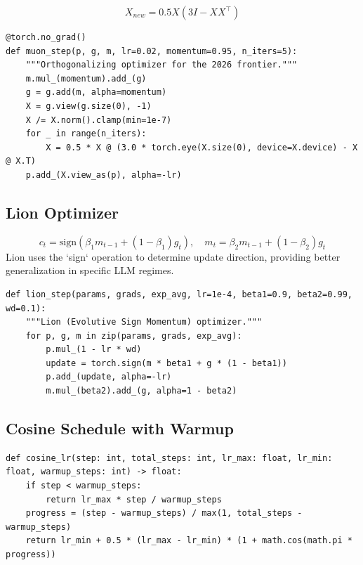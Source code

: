 \[
  X_{new} = 0.5 X (3I - XX^\top)
\]

\begin{lstlisting}[style=pythonstyle, caption={Muon update step}, label=lst:muon]
@torch.no_grad()
def muon_step(p, g, m, lr=0.02, momentum=0.95, n_iters=5):
    """Orthogonalizing optimizer for the 2026 frontier."""
    m.mul_(momentum).add_(g)
    g = g.add(m, alpha=momentum)
    X = g.view(g.size(0), -1)
    X /= X.norm().clamp(min=1e-7)
    for _ in range(n_iters):
        X = 0.5 * X @ (3.0 * torch.eye(X.size(0), device=X.device) - X @ X.T)
    p.add_(X.view_as(p), alpha=-lr)
\end{lstlisting}

\subsection{Lion Optimizer}
\label{form:lion}

\[
  c_t = \text{sign}(\beta_1 m_{t-1} + (1-\beta_1) g_t), \quad m_t = \beta_2 m_{t-1} + (1-\beta_2) g_t
\]
Lion uses the `sign` operation to determine update direction, providing better generalization in specific LLM regimes.

\begin{lstlisting}[style=pythonstyle, caption={Lion update step}, label=lst:lion]
def lion_step(params, grads, exp_avg, lr=1e-4, beta1=0.9, beta2=0.99, wd=0.1):
    """Lion (Evolutive Sign Momentum) optimizer."""
    for p, g, m in zip(params, grads, exp_avg):
        p.mul_(1 - lr * wd)
        update = torch.sign(m * beta1 + g * (1 - beta1))
        p.add_(update, alpha=-lr)
        m.mul_(beta2).add_(g, alpha=1 - beta2)
\end{lstlisting}

\subsection{Cosine Schedule with Warmup}
\label{form:cosine}

\begin{lstlisting}[style=pythonstyle, caption={Cosine LR schedule with warmup}, label=lst:cosine]
def cosine_lr(step: int, total_steps: int, lr_max: float, lr_min: float, warmup_steps: int) -> float:
    if step < warmup_steps:
        return lr_max * step / warmup_steps
    progress = (step - warmup_steps) / max(1, total_steps - warmup_steps)
    return lr_min + 0.5 * (lr_max - lr_min) * (1 + math.cos(math.pi * progress))
\end{lstlisting}

